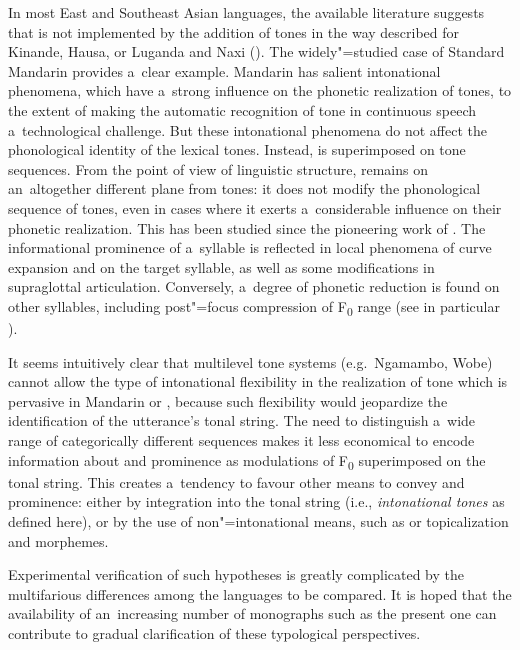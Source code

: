 In most East and Southeast Asian languages, the
available literature suggests that  is not implemented by the addition of
tones in the way described for Kinande, Hausa, or Luganda and {Naxi} (). 
The widely"=studied case
of Standard Mandarin provides a~clear example. {Mandarin} has salient intonational phenomena, which have
a~strong influence on the phonetic realization of tones, to the extent of making the automatic
recognition of tone in continuous speech a~technological challenge. But these intonational phenomena do not
affect the phonological identity of the lexical tones. Instead,  is superimposed on tone
sequences. From the point of view of linguistic structure,  remains on an~altogether
different plane from tones: it does not modify the phonological sequence of tones, even in cases
where it exerts a~considerable influence on their phonetic realization. This has been studied since
the pioneering work of \citet{chao1929}. 
The informational
prominence of a~syllable is reflected in local phenomena of curve expansion and  on the
target syllable, as well as some modifications in supraglottal articulation. Conversely, a~degree of
phonetic reduction is found on other syllables, including post"=focus compression of F\textsubscript{0}
range (see in particular \citealt{xu1999}).

It seems intuitively clear that multilevel tone systems (e.g.~Ngamambo, Wobe) cannot allow the type of intonational
flexibility in the realization of tone which is pervasive in {Mandarin} or , because such
flexibility would jeopardize the identification of the utterance’s tonal string. The need to distinguish a~wide range of categorically different sequences makes it less economical to encode information about 
and prominence as modulations of F\textsubscript{0} superimposed on the tonal string. This creates a~tendency to favour other means to convey  and prominence: either by
integration into the tonal string (i.e., \textit{intonational tones} as defined here), or by the use
of non"=intonational means, such as  or topicalization and  morphemes. 

Experimental verification of such hypotheses is greatly complicated by the multifarious
differences among the languages to be compared. It is hoped that the availability of an~increasing number of monographs such as the present one can contribute to gradual clarification of these typological perspectives.
